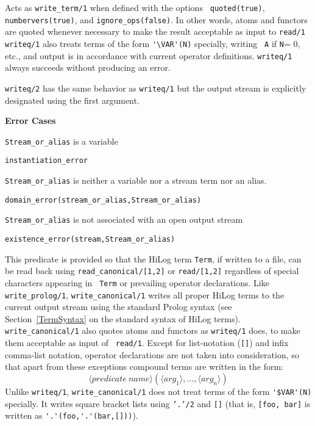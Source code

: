 \begin{description}
%
Acts as {\tt write\_term/1} when defined with the options {\tt
  quoted(true)}, {\tt numbervers(true)}, and {\tt ignore\_ops(false)}.
In other words, atoms and functors are quoted whenever necessary to
make the result acceptable as input to {\tt read/1} {\tt writeq/1}
also treats terms of the form \verb|'\VAR'(N)| specially, writing {\tt
  A} if {\tt N}= 0, etc., and output is in accordance with current
operator definitions.  {\tt writeq/1} always succeeds without
producing an error.

%
	{\tt writeq/2} has the same behavior as {\tt writeq/1} but the
	output stream is explicitly designated using the first argument.

{\bf Error Cases} 
\bi
\item 	{\tt Stream\_or\_alias} is a variable
\bi
\item {\tt instantiation\_error}
\ei
\item 	{\tt Stream\_or\_alias} is neither a variable nor a stream term nor an alias.
\bi
\item 	{\tt domain\_error(stream\_or\_alias,Stream\_or\_alias)}
\ei
\item 	{\tt Stream\_or\_alias} is not associated with an open output stream
\bi
\item 	{\tt existence\_error(stream,Stream\_or\_alias)}
\ei
\ei

%
This predicate is provided so that the HiLog term {\tt Term}, if
written to a file, can be read back using {\tt read\_canonical/[1,2]}
or {\tt read/[1,2]} regardless of special characters appearing in {\tt
  Term} or prevailing operator declarations. Like {\tt
  write\_prolog/1}, {\tt write\_canonical/1} writes all proper HiLog
terms to the current output stream using the standard Prolog syntax
(see Section~\ref{TermSyntax} on the standard syntax of HiLog
terms). {\tt write\_canonical/1} also quotes atoms and functors as
{\tt writeq/1} does, to make them acceptable as input of {\tt
  read/1}\@.  Except for list-notation ({\tt []}) and infix comma-list
notation, operator declarations are not taken into consideration, so
that apart from these exceptions compound terms are written in the
form:
%
		\[ \langle predicate\ name \rangle
			(\langle arg_1 \rangle, \ldots,
			 \langle arg_n \rangle) \]
%
Unlike {\tt writeq/1}, {\tt write\_canonical/1} does not treat terms
of the form \verb|'$VAR'(N)| specially. It writes square bracket lists
using {\tt '.'/2} and {\tt []} (that is, {\tt [foo, bar]} is written
as \verb|'.'(foo,'.'(bar,[]))|).


\end{description}
